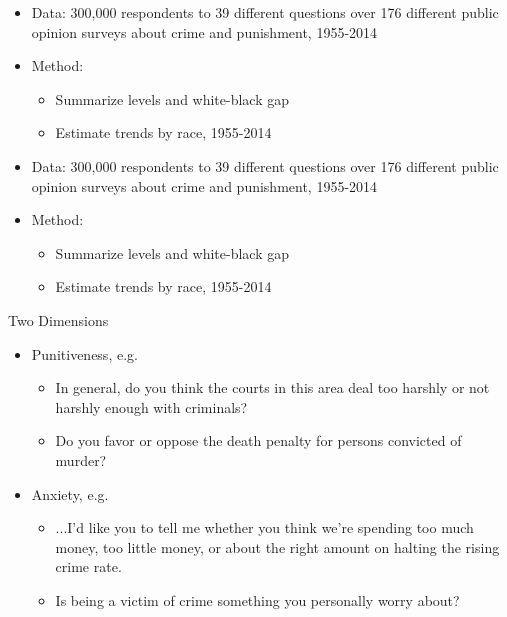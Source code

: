 \documentclass{beamer}
\begin{document}
\begin{frame}{}
\begin{center}
    {\Large \claimthreeq}
\end{center}
\end{frame}

\begin{frame}{\claimthreeq} 
\begin{itemize}[<+->]
    \item[] \alert{Data:} 300,000 respondents to 39 different questions over 176 different public opinion surveys about crime and punishment, 1955-2014
    \item[] \alert{Method:} 
    \begin{itemize}
        \item Summarize levels and white-black gap
        \item Estimate trends by race, 1955-2014
    \end{itemize}
\end{itemize}
\end{frame}

\begin{frame}{\claimthreeq} 
\begin{itemize}
    \item[] \alert{Data:} 300,000 respondents to 39 different questions over 176 different public opinion surveys about crime and punishment, 1955-2014
    \item[] \alert{Method:} 
    \begin{itemize}
        \item Summarize levels and white-black gap
        \item \alert{Estimate trends by race, 1955-2014}
    \end{itemize}
\end{itemize}
\end{frame}

\begin{frame}{Two Dimensions}
\begin{itemize}
    \item[] \alert{Punitiveness, e.g.}
    \begin{itemize}
        \item In general, do you think the courts in this area deal too harshly or not harshly enough with criminals? 
        \item Do you favor or oppose the death penalty for persons convicted of murder?
    \end{itemize}
    \item[] \alert{Anxiety, e.g.}
        \begin{itemize}
        \item ...I'd like you to tell me whether you think we're spending too much money, too little money, or about the right amount on halting the rising crime rate. 
        \item Is being a victim of crime something you personally worry about?
    \end{itemize}
\end{itemize}
\end{frame}
\end{document}
